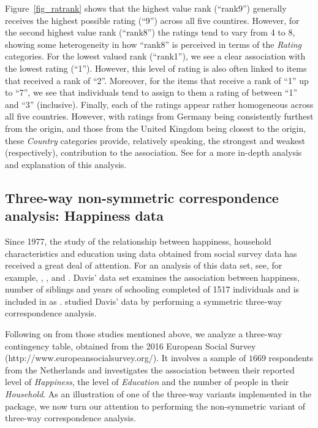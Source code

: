 Figure~\ref{fig_ratrank} shows that the highest value rank (``rank9'') generally receives the highest possible rating (``9'') across all five countires. However, for the second highest value rank (``rank8'') the ratings tend to vary from 4 to 8, showing some heterogeneity in how ``rank8'' is perceived in terms of the {\it Rating} categories. For the lowest valued rank (``rank1''), we see a clear association with the lowest rating (``1''). However, this level of rating is also often linked to items that received a rank of ``2''. Moreover, for the items that receive a rank of ``1'' up to ``7'', we see that individuals tend to assign to them a rating of between ``1'' and ``3'' (inclusive). Finally, each of the ratings appear rather homogeneous across all five countries. However, with ratings from Germany being consistently furthest from the origin, and those from the United Kingdom being closest to the origin, these {\it Country} categories provide, relatively speaking, the strongest and weakest (respectively), contribution to the association. See \cite{vel07} for a more in-depth analysis and explanation of this analysis. 
\subsection{Three-way non-symmetric correspondence analysis: Happiness data}
\label{s.62}


Since 1977, the study of the relationship between happiness, household characteristics and education using data obtained from social survey data has received a great deal of attention. For an analysis of this data set, see, for example,  \cite{dav77}, \cite{clog82}, \cite{behdav98} and \citet[Chap.17]{kro08}. Davis' data set  \citet{dav77} examines the association between happiness, number of siblings and years of schooling completed of 1517 individuals  and is included in  as . \citet[Chap.17]{kro08} studied Davis' data by performing a symmetric three-way correspondence analysis. 

Following on from those studies mentioned above,  we analyze a three-way contingency table, obtained from the 2016 European Social Survey (http://www.europeansocialsurvey.org/). It involves a sample of  $1669$ respondents from the Netherlands and investigates the association between their reported level of {\it Happiness}, the  level of {\it Education} and the number of people in their {\it Household}. As an illustration of one of the three-way variants implemented in the  package, we now turn our attention to performing the non-symmetric variant of three-way correspondence analysis.  

